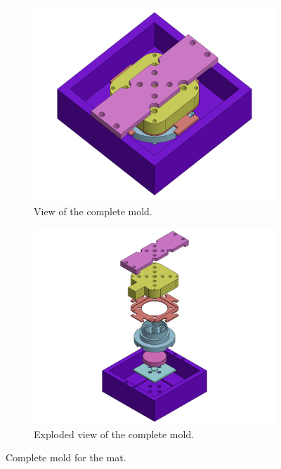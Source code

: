 \begin{figure}[H]
    \centering
    \begin{subfigure}[b]{0.475\textwidth}
        \centering
        \includegraphics[width = 1\linewidth]{Chapters/Chapter5/Flexible_Mat_Prototypes/Figures/mold_complete.png}
        \caption{View of the complete mold.}
        \label{fig: mat_v1}
    \end{subfigure}
    \hfill
    \begin{subfigure}[b]{0.475\textwidth}
        \centering
        \includegraphics[width = 1\linewidth]{Chapters/Chapter5/Flexible_Mat_Prototypes/Figures/mold_complete_exploded.png}
        \caption{Exploded view of the complete mold.}
        \label{fig: mold_v1}
    \end{subfigure}
    \caption{Complete mold for the mat.}
\end{figure}